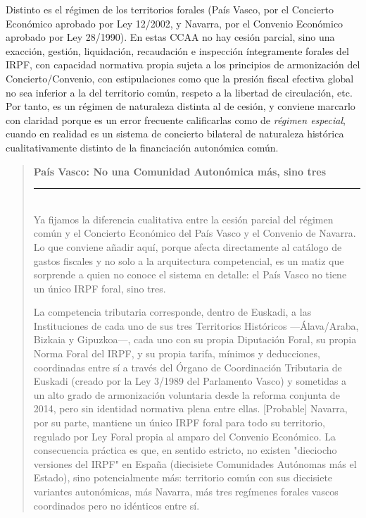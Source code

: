 \documentclass[10pt,a4paper]{article}
\newenvironment{specialblock}[1]{%
      \begin{quote} %
      \small %
      \noindent\textbf{#1}\\[-0.3em] %
      \rule{\linewidth}{0.4pt}\\[0.6em]}{
      \end{quote}}
\begin{document}
Distinto es el régimen de los territorios forales (País Vasco, por el Concierto Económico aprobado por Ley 12/2002, y Navarra, por el Convenio Económico aprobado por Ley 28/1990). En estas CCAA no hay cesión parcial, sino una exacción, gestión, liquidación, recaudación e inspección íntegramente forales del IRPF, con capacidad normativa propia sujeta a los principios de armonización del Concierto/Convenio, con estipulaciones como que la presión fiscal efectiva global no sea inferior a la del territorio común, respeto a la libertad de circulación, etc. Por tanto, es un régimen de naturaleza distinta al de cesión, y conviene marcarlo con claridad porque es un error frecuente calificarlas como de \textit{régimen especial}, cuando en realidad es un sistema de concierto bilateral de naturaleza histórica cualitativamente distinto de la financiación autonómica común.

\begin{specialblock}{\textbf{País Vasco:} No una Comunidad Autonómica más, sino tres}
    Ya fijamos la diferencia cualitativa entre la cesión parcial del régimen común y el Concierto Económico del País Vasco y el Convenio de Navarra. Lo que conviene añadir aquí, porque afecta directamente al catálogo de gastos fiscales y no solo a la arquitectura competencial, es un matiz que sorprende a quien no conoce el sistema en detalle: el País Vasco no tiene un único IRPF foral, sino tres. 

    La competencia tributaria corresponde, dentro de Euskadi, a las Instituciones de cada uno de sus tres Territorios Históricos —Álava/Araba, Bizkaia y Gipuzkoa—, cada uno con su propia Diputación Foral, su propia Norma Foral del IRPF, y su propia tarifa, mínimos y deducciones, coordinadas entre sí a través del Órgano de Coordinación Tributaria de Euskadi (creado por la Ley 3/1989 del Parlamento Vasco) y sometidas a un alto grado de armonización voluntaria desde la reforma conjunta de 2014, pero sin identidad normativa plena entre ellas. [Probable] Navarra, por su parte, mantiene un único IRPF foral para todo su territorio, regulado por Ley Foral propia al amparo del Convenio Económico. La consecuencia práctica es que, en sentido estricto, no existen "dieciocho versiones del IRPF" en España (diecisiete Comunidades Autónomas más el Estado), sino potencialmente más: territorio común con sus diecisiete variantes autonómicas, más Navarra, más tres regímenes forales vascos coordinados pero no idénticos entre sí.
\end{specialblock}
\end{document}
